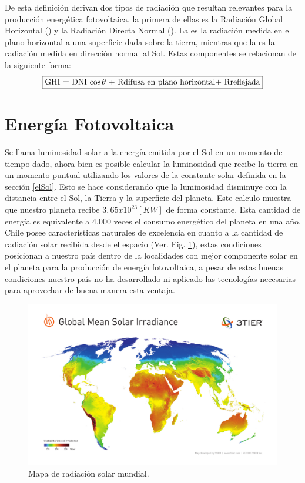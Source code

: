 De esta definición derivan dos tipos de radiación que resultan relevantes para la producción energética fotovoltaica, la primera de ellas es la Radiación Global Horizontal () y la Radiación Directa Normal (). La  es la radiación medida en el plano horizontal a una superficie dada sobre la tierra, mientras que la  es la radiación medida en dirección normal al Sol. Estas componentes se relacionan de la siguiente forma:
$$\fbox{GHI = DNI $\cos \theta$ + Rdifusa en plano horizontal+ Rreflejada}$$

\section{Energía Fotovoltaica}
Se llama luminosidad solar a la energía emitida por el Sol en un momento de tiempo dado, ahora bien es posible calcular la luminosidad que recibe la tierra en un momento puntual utilizando los valores de la constante solar definida en la sección \ref{elSol}. Esto se hace considerando que la luminosidad disminuye con la distancia entre el Sol, la Tierra y la superficie del planeta. Este calculo muestra que nuestro planeta recibe $3,65 x {10}^{23} [KW]$ de forma constante. Esta cantidad de energía es equivalente a 4.000 veces el consumo energético del planeta en una año\cite{energiaSustentable:1}.\\
Chile posee características naturales de excelencia en cuanto a la cantidad de radiación solar recibida desde el espacio (Ver. Fig. \ref{fig:mapaRadiacion}), estas condiciones posicionan a nuestro país dentro de la localidades con mejor componente solar en el planeta para la producción de energía fotovoltaica, a pesar de estas buenas condiciones nuestro país no ha desarrollado ni aplicado las tecnologías necesarias para aprovechar de buena manera esta ventaja.\\

\begin{figure}[h!]
        \centering
        \includegraphics[scale=0.3]{images/3tier_solar_irradiance}
        \caption{Mapa de radiación solar mundial\cite{3tier}.}
        \label{fig:mapaRadiacion}
\end{figure}

